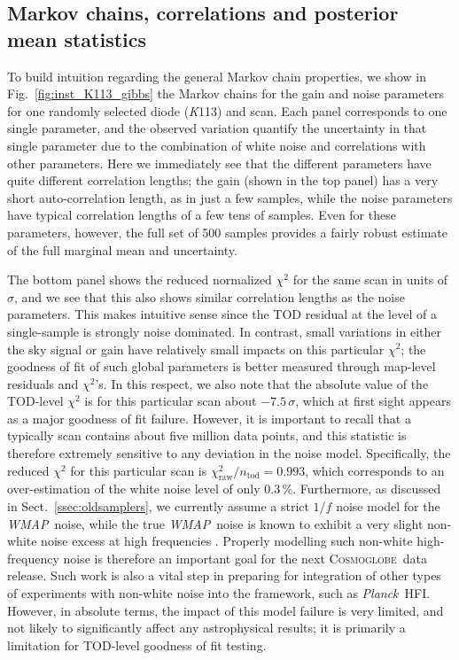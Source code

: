 \documentclass[twocolumn]{../../common/aa}
\def\WMAP{\emph{WMAP}}
\def\Planck{\emph{Planck}}
\newcommand{\cosmoglobe}{\textsc{Cosmoglobe}}
\newcommand{\K}[0]{\textit K}
\begin{document}
\subsection{Markov chains, correlations and posterior mean statistics}
\label{sec:summary_stats}

To build intuition regarding the general Markov chain properties, we show in Fig.~\ref{fig:inst_K113_gibbs} the Markov chains for the gain and noise parameters for one randomly selected diode (\K113) and scan. Each panel corresponds to one single parameter, and the observed variation quantify the uncertainty in that single parameter due to the combination of white noise and correlations with other parameters. Here we immediately see that the different parameters have quite different correlation lengths; the gain (shown in the top panel) has a very short auto-correlation length, as in just a few samples, while the noise parameters have typical correlation lengths of a few tens of samples. Even for these parameters, however, the full set of 500 samples provides a fairly robust estimate of the full marginal mean and uncertainty.

The bottom panel shows the reduced normalized $\chi^2$ for the same scan in units of $\sigma$, and we see that this also shows similar correlation lengths as the noise parameters. This makes intuitive sense since the TOD residual at the level of a single-sample is strongly noise dominated. In contrast, small variations in either the sky signal or gain have relatively small impacts on this particular $\chi^2$; the goodness of fit of such global parameters is better measured through map-level residuals and $\chi^2$'s. In this respect, we also note that the absolute value of the TOD-level $\chi^2$ is for this particular scan about $-7.5\,\sigma$, which at first sight appears as a major goodness of fit failure. However, it is important to recall that a typically scan contains about five million data points, and this statistic is therefore extremely sensitive to any deviation in the noise model. Specifically, the reduced $\chi^2$ for this particular scan is $\chi_{\mathrm{raw}}^2/n_{\mathrm{tod}}=0.993$, which corresponds to an over-estimation of the white noise level of only 0.3\,\%. Furthermore, as discussed in Sect.~\ref{ssec:oldsamplers}, we currently assume a strict $1/f$ noise model for the \WMAP\ noise, while the true \WMAP\ noise is known to exhibit a very slight non-white noise excess at high frequencies \citep{bp17}. Properly modelling such non-white high-frequency noise is therefore an important goal for the next \cosmoglobe\ data release.  Such work is also a vital step in preparing for integration of other types of experiments with non-white noise into the framework, such as \Planck\ HFI. However, in absolute terms, the impact of this model failure is very limited, and not likely to significantly affect any astrophysical results; it is primarily a limitation for TOD-level goodness of fit testing.
\end{document}
